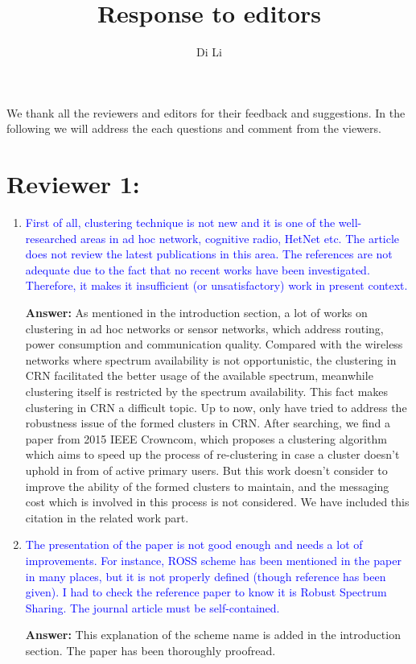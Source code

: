 \documentclass[10pt,a4paper]{article}
\author{Di Li}
\title{Response to editors}
\begin{document}
We thank all the reviewers and editors for their feedback and suggestions.
In the following we will address the each questions and comment from the viewers.

\section{Reviewer 1:}

\begin{enumerate}

\item \textcolor{blue}{  First of all, clustering technique is not new and it is one of the well-researched areas in ad hoc network, cognitive radio, HetNet etc. The article does not review the latest publications in this area. The references are not adequate due to the fact that no recent works have been investigated. Therefore, it makes it insufficient (or unsatisfactory) work in present context.}

\textbf{Answer:} As mentioned in the introduction section, a lot of works on clustering in ad hoc networks or sensor networks, which address routing, power consumption and communication quality.
Compared with the wireless networks where spectrum availability is not opportunistic, the clustering in CRN facilitated the better usage of the available spectrum, meanwhile clustering itself is restricted by the spectrum availability.
This fact makes clustering in CRN a difficult topic.
Up to now, only \cite{LIU_TMC11_2, Li11_ROSS, mansoor_15_cluster_robust} have tried to address the robustness issue of the formed clusters in CRN.
After searching, we find a paper \cite{Mansoor2015} from 2015 IEEE Crowncom, which proposes a clustering algorithm which aims to speed up the process of re-clustering in case a cluster doesn't uphold in from of active primary users.
But this work doesn't consider to improve the ability of the formed clusters to maintain, and the messaging cost which is involved in this process is not considered.
We have included this citation in the related work part.

 
\item \textcolor{blue}{  The presentation of the paper is not good enough and needs a lot of improvements. For instance, ROSS scheme has been mentioned in the paper in many places, but it is not properly defined (though reference has been given). I had to check the reference paper to know it is Robust Spectrum Sharing. The journal article must be self-contained.}
    
    \textbf{Answer:} This explanation of the scheme name is added in the introduction section.
    The paper has been thoroughly proofread.
    

\end{enumerate}
\end{document}
